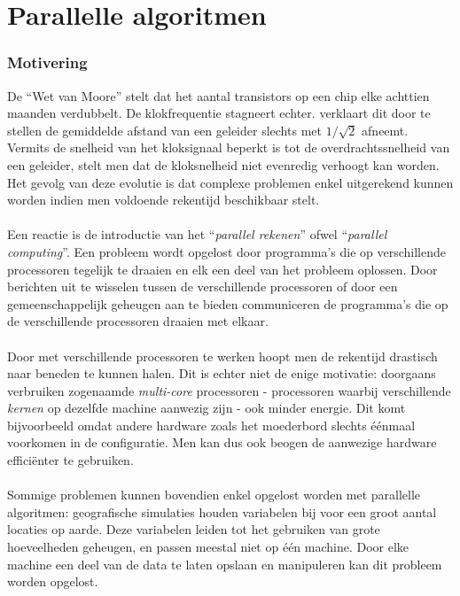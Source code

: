 \section{Parallelle algoritmen}

\subsubsection{Motivering}

De ``Wet van Moore''\cite{4785860} stelt dat het aantal transistors op een chip elke achttien maanden verdubbelt. De klokfrequentie stagneert echter. \cite{nomoore} verklaart dit door te stellen de gemiddelde afstand van een geleider slechts met $1/\sqrt{2}$ afneemt. Vermits de snelheid van het kloksignaal beperkt is tot de overdrachtssnelheid van een geleider, stelt men dat de kloksnelheid niet evenredig verhoogt kan worden. Het gevolg van deze evolutie is dat complexe problemen enkel uitgerekend kunnen worden indien men voldoende rekentijd beschikbaar stelt.
\paragraph{}
Een reactie is de introductie van het ``\emph{parallel rekenen}'' ofwel ``\emph{parallel computing}''. Een probleem wordt opgelost door programma's die op verschillende processoren tegelijk te draaien en elk een deel van het probleem oplossen. Door berichten uit te wisselen tussen de verschillende processoren of door een gemeenschappelijk geheugen aan te bieden communiceren de programma's die op de verschillende processoren draaien met elkaar.\cite{books/bc/KumarGGK94}

\paragraph{}
Door met verschillende processoren te werken hoopt men de rekentijd drastisch naar beneden te kunnen halen. Dit is echter niet de enige motivatie: doorgaans verbruiken zogenaamde \emph{multi-core} processoren - processoren waarbij verschillende \emph{kernen} op dezelfde machine aanwezig zijn - ook minder energie. Dit komt bijvoorbeeld omdat andere hardware zoals het moederbord slechts \'e\'enmaal voorkomen in de configuratie. Men kan dus ook beogen de aanwezige hardware effici\"enter te gebruiken.\cite{Korthikanti:2009:APA:1678990.1679696,parenergy}

\paragraph{}
Sommige problemen kunnen bovendien enkel opgelost worden met parallelle algoritmen: geografische simulaties houden variabelen bij voor een groot aantal locaties op aarde. Deze variabelen leiden tot het gebruiken van grote hoeveelheden geheugen, en passen meestal niet op \'e\'en machine. Door elke machine een deel van de data te laten opslaan en manipuleren kan dit probleem worden opgelost.\cite{journals/pc/HawickCJ03}

